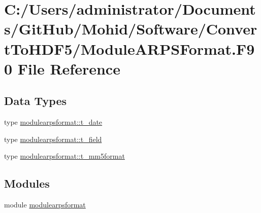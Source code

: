\hypertarget{_module_a_r_p_s_format_8_f90}{}\section{C\+:/\+Users/administrator/\+Documents/\+Git\+Hub/\+Mohid/\+Software/\+Convert\+To\+H\+D\+F5/\+Module\+A\+R\+P\+S\+Format.F90 File Reference}
\label{_module_a_r_p_s_format_8_f90}
\subsection*{Data Types}
\begin{DoxyCompactItemize}
\item 
type \mbox{\hyperlink{structmodulearpsformat_1_1t__date}{modulearpsformat\+::t\+\_\+date}}
\item 
type \mbox{\hyperlink{structmodulearpsformat_1_1t__field}{modulearpsformat\+::t\+\_\+field}}
\item 
type \mbox{\hyperlink{structmodulearpsformat_1_1t__mm5format}{modulearpsformat\+::t\+\_\+mm5format}}
\end{DoxyCompactItemize}
\subsection*{Modules}
\begin{DoxyCompactItemize}
\item 
module \mbox{\hyperlink{namespacemodulearpsformat}{modulearpsformat}}
\end{DoxyCompactItemize}
